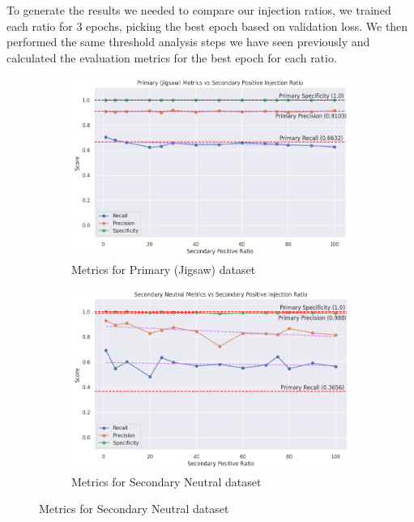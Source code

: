 To generate the results we needed to compare our injection ratios, we trained each ratio for 3 epochs, picking the best epoch based on validation loss. We then performed the same threshold analysis steps we have seen previously and calculated the evaluation metrics for the best epoch for each ratio.

\begin{figure}
    \centering
    \begin{subfigure}[b]{0.49\textwidth}
        \includegraphics[width=\textwidth]{graphs/ratio/topic_6/primary.png}
        \caption{Metrics for Primary (Jigsaw) dataset}
        \label{subfig:primary_metrics}
    \end{subfigure}
    \hfill
    \begin{subfigure}[b]{0.49\textwidth}
        \includegraphics[width=\textwidth]{graphs/ratio/topic_6/sn.png}
        \caption{Metrics for Secondary Neutral dataset}
        \label{subfig:secondary_neutral_metrics}
    \end{subfigure}


\end{figure}
